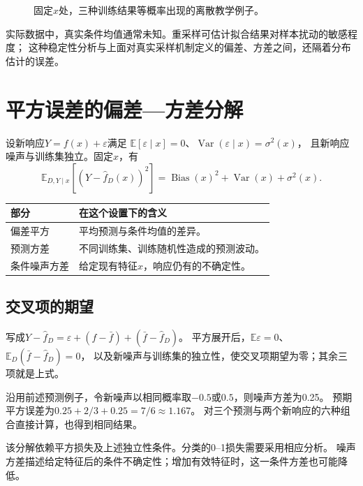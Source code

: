 \begin{figure}[htbp]
\centering
\caption{固定$x$处，三种训练结果等概率出现的离散教学例子。}
\par\smallskip
{}
\end{figure}

实际数据中，真实条件均值通常未知。重采样可估计拟合结果对样本扰动的敏感程度；
这种稳定性分析与上面对真实采样机制定义的偏差、方差之间，还隔着分布估计的误差。

\section{平方误差的偏差—方差分解}
\label{sec:learn-decomposition}
设新响应$Y=f(x)+\varepsilon$满足
$\mathbb E[\varepsilon\mid x]=0$、$\operatorname{Var}(\varepsilon\mid x)=\sigma^2(x)$，
且新响应噪声与训练集独立。固定$x$，有
\[
 \mathbb E_{D,Y\mid x}[(Y-\hat f_D(x))^2]
 =\operatorname{Bias}(x)^2+\operatorname{Var}(x)+\sigma^2(x).
\]

\begin{center}
\begin{tabularx}{\textwidth}{P{30mm}Y}
\toprule
部分 & 在这个设置下的含义\\
\midrule
偏差平方 & 平均预测与条件均值的差异。\\
预测方差 & 不同训练集、训练随机性造成的预测波动。\\
条件噪声方差 & 给定现有特征$x$，响应仍有的不确定性。\\
\bottomrule
\end{tabularx}
\end{center}

\subsection{交叉项的期望}
写成$Y-\hat f_D=\varepsilon+(f-\bar f)+(\bar f-\hat f_D)$。
平方展开后，$\mathbb E\varepsilon=0$、$\mathbb E_D(\bar f-\hat f_D)=0$，
以及新噪声与训练集的独立性，使交叉项期望为零；其余三项就是上式。

沿用前述预测例子，令新噪声以相同概率取$-0.5$或$0.5$，则噪声方差为0.25。
预期平方误差为$0.25+2/3+0.25=7/6\approx1.167$。
对三个预测与两个新响应的六种组合直接计算，也得到相同结果。

该分解依赖平方损失及上述独立性条件。分类的0--1损失需要采用相应分析。
噪声方差描述给定特征后的条件不确定性；增加有效特征时，这一条件方差也可能降低。


